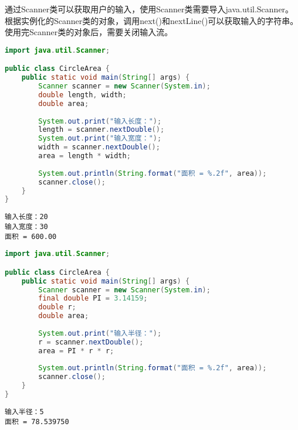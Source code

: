 通过Scanner类可以获取用户的输入，使用Scanner类需要导入java.util.Scanner。根据实例化的Scanner类的对象，调用next()和nextLine()可以获取输入的字符串。 \\

使用完Scanner类的对象后，需要关闭输入流。 \\


\begin{lstlisting}[language=Java]
import java.util.Scanner;

public class CircleArea {
	public static void main(String[] args) {
		Scanner scanner = new Scanner(System.in);
		double length, width;
		double area;
		
		System.out.print("输入长度：");
		length = scanner.nextDouble();
		System.out.print("输入宽度：");
		width = scanner.nextDouble();
		area = length * width;
		
		System.out.println(String.format("面积 = %.2f", area));
		scanner.close();
	}
}
\end{lstlisting}

\begin{tcolorbox}
	\begin{verbatim}
输入长度：20
输入宽度：30
面积 = 600.00
	\end{verbatim}
\end{tcolorbox}

\vspace{0.5cm}


\begin{lstlisting}[language=Java]
import java.util.Scanner;

public class CircleArea {
	public static void main(String[] args) {
		Scanner scanner = new Scanner(System.in);
		final double PI = 3.14159;
		double r;
		double area;
		
		System.out.print("输入半径：");
		r = scanner.nextDouble();
		area = PI * r * r;
		
		System.out.println(String.format("面积 = %.2f", area));
		scanner.close();
	}
}
\end{lstlisting}

\begin{tcolorbox}
	\begin{verbatim}
输入半径：5
面积 = 78.539750
	\end{verbatim}
\end{tcolorbox}

\vspace{0.5cm}

